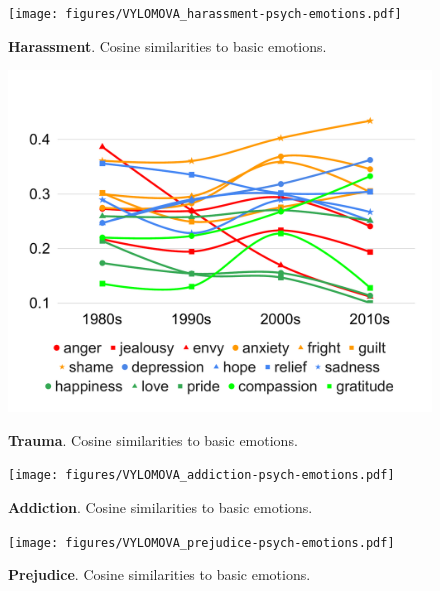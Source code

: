 \documentclass[output=paper]{langsci/langscibook}
\begin{document}
\begin{figure}
        \centering
        {\texttt{[image: figures/VYLOMOVA\_harassment-psych-emotions.pdf]}
        }\par\vfill
 \caption{\textbf{Harassment}. Cosine similarities to basic emotions.}
\label{fig:emotion-cos-sim-harassment}
\end{figure}


\begin{figure}
        \centering
        {\includegraphics[width=.95\textwidth]{figures/VYLOMOVA_trauma-psych-emotions.pdf}
        }\par\vfill
 \caption{\textbf{Trauma}. Cosine similarities to basic emotions.}
\label{fig:emotion-cos-sim-trauma}
\end{figure}



\begin{figure}
        \centering
        {\texttt{[image: figures/VYLOMOVA\_addiction-psych-emotions.pdf]}
        }\par\vfill
 \caption{\textbf{Addiction}. Cosine similarities to basic emotions.}
\label{fig:emotion-cos-sim-addiction}
\end{figure}

\begin{figure}
        \centering
        {\texttt{[image: figures/VYLOMOVA\_prejudice-psych-emotions.pdf]}
        }\par\vfill
 \caption{\textbf{Prejudice}. Cosine similarities to basic emotions.}
\label{fig:emotion-cos-sim-prejudice}
\end{figure}
\end{document}
